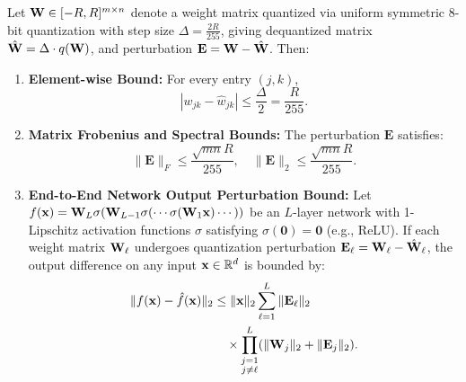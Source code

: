 \begin{theorem}
\label{thm:quant_error}
Let $\mathbf{W} \in [-R, R]^{m \times n}$ denote a weight matrix quantized via uniform symmetric 8-bit quantization with step size $\Delta = \frac{2R}{255}$, giving dequantized matrix $\hat{\mathbf{W}} = \Delta \cdot q(\mathbf{W})$, and perturbation $\mathbf{E} = \mathbf{W} - \hat{\mathbf{W}}$.
Then:
\begin{enumerate}[label=(\roman*),leftmargin=1.5em,itemsep=2pt]
  \item \textbf{Element-wise Bound:} For every entry $(j, k)$,
  \begin{equation}
    |w_{jk} - \hat{w}_{jk}| \leq \frac{\Delta}{2} = \frac{R}{255}.
    \label{eq:elem_bound}
  \end{equation}
  \item \textbf{Matrix Frobenius and Spectral Bounds:} The perturbation $\mathbf{E}$ satisfies:
  \begin{equation}
    \|\mathbf{E}\|_F \leq \frac{\sqrt{mn} R}{255}, \quad \|\mathbf{E}\|_2 \leq \frac{\sqrt{mn} R}{255}.
    \label{eq:frob_bound}
  \end{equation}
  \item \textbf{End-to-End Network Output Perturbation Bound:}
    Let $f(\mathbf{x}) = \mathbf{W}_L \sigma(\mathbf{W}_{L-1} \sigma(\cdots \sigma(\mathbf{W}_1 \mathbf{x})\cdots))$ be an $L$-layer network with 1-Lipschitz activation functions $\sigma$ satisfying $\sigma(\mathbf{0}) = \mathbf{0}$ (e.g., ReLU).
    If each weight matrix $\mathbf{W}_\ell$ undergoes quantization perturbation $\mathbf{E}_\ell = \mathbf{W}_\ell - \hat{\mathbf{W}}_\ell$, the output difference on any input $\mathbf{x} \in \mathbb{R}^d$ is bounded by:
    \begin{align}
      \|f(\mathbf{x}) - \hat{f}(\mathbf{x})\|_2
      &\leq \|\mathbf{x}\|_2 \sum_{\ell=1}^L \|\mathbf{E}_\ell\|_2 \nonumber\\
      &\quad \times \prod_{\substack{j=1 \\ j \neq \ell}}^L (\|\mathbf{W}_j\|_2 + \|\mathbf{E}_j\|_2).
      \label{eq:net_bound}
    \end{align}
\end{enumerate}
\end{theorem}

